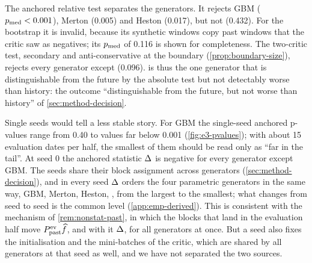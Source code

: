 The anchored relative test separates the generators. It rejects GBM ($p_{\mathrm{med}}<0.001$), Merton
(0.005) and Heston (0.017), but not \GARCHt{} (0.432). For the bootstrap it is invalid, because
its synthetic windows copy past windows that the critic saw as negatives; its $p_{\mathrm{med}}$ of 0.116
is shown for completeness. The two-critic test, secondary and anti-conservative at the boundary
(\cref{prop:boundary-size}), rejects every generator except \GARCHt{} (0.096). \GARCHt{} is thus
the one generator that is distinguishable from the future by the absolute \WC{} test but not
detectably worse than history: the outcome ``distinguishable from the future, but not worse than
history'' of \cref{sec:method-decision}.

Single seeds would tell a less stable story. For GBM the single-seed anchored p-values range
from 0.40 to values far below 0.001 (\cref{fig:e3-pvalues}); with about 15 evaluation dates per
half, the smallest of them should be read only as ``far in the tail''. At seed 0 the anchored
statistic $\Delta$ is negative for every generator except GBM. The seeds share their block
assignment across generators (\cref{sec:method-decision}), and in every seed $\Delta$ orders the
four parametric generators in the same way, GBM, Merton, Heston, \GARCHt{}, from the largest to
the smallest; what changes from seed to seed is the common level (\cref{app:emp-derived}). This
is consistent with the mechanism of \cref{rem:nonstat-past}, in which the \TRAIN{} blocks that
land in the evaluation half move $P_{\mathrm{past}}^{\mathrm{ev}}\widehat{f}$, and with it $\Delta$, for all generators at
once. But a seed also fixes the initialisation and the mini-batches of the critic, which are
shared by all generators at that seed as well, and we have not separated the two sources.

\begin{table}[tbp]
  \centering
  \caption{Pooled tests per generator (E3): $\pmed=\min\{1,2\med_sp_s\}$ over five synthetic
    seeds; for absolute tests, the number of seeds with $p_s\le0.05$ in parentheses. 100
    tickers, $L=20$; 3000 real \TEST{} and 3000 synthetic windows; relative tests with
    $\Rpast$ = the 6200 real \TRAIN{} windows.}
  \label{tab:e3-pooled-tests}
  \small
\end{table}

